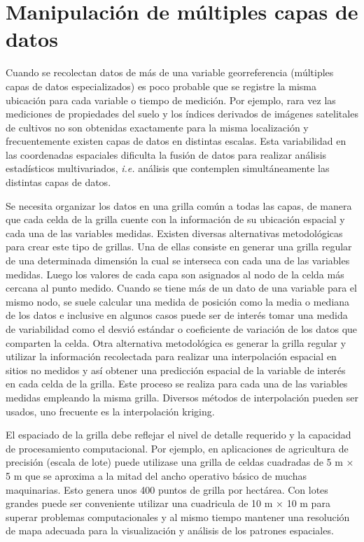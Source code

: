 \documentclass[11pt,b5paper,]{krantz}
\begin{document}
\hypertarget{manipulaciuxf3n-de-muxfaltiples-capas-de-datos}{%
\section{Manipulación de múltiples capas de datos}\label{manipulaciuxf3n-de-muxfaltiples-capas-de-datos}}

Cuando se recolectan datos de más de una variable georreferencia (múltiples capas de datos especializados) es poco probable que se registre la misma ubicación para cada variable o tiempo de medición. Por ejemplo, rara vez las mediciones de propiedades del suelo y los índices derivados de imágenes satelitales de cultivos no son obtenidas exactamente para la misma localización y frecuentemente existen capas de datos en distintas escalas. Esta variabilidad en las coordenadas espaciales dificulta la fusión de datos para realizar análisis estadísticos multivariados, \emph{i.e.} análisis que contemplen simultáneamente las distintas capas de datos.

Se necesita organizar los datos en una grilla común a todas las capas, de manera que cada celda de la grilla cuente con la información de su ubicación espacial y cada una de las variables medidas. Existen diversas alternativas metodológicas para crear este tipo de grillas. Una de ellas consiste en generar una grilla regular de una determinada dimensión la cual se interseca con cada una de las variables medidas. Luego los valores de cada capa son asignados al nodo de la celda más cercana al punto medido. Cuando se tiene más de un dato de una variable para el mismo nodo, se suele calcular una medida de posición como la media o mediana de los datos e inclusive en algunos casos puede ser de interés tomar una medida de variabilidad como el desvió estándar o coeficiente de variación de los datos que comparten la celda. Otra alternativa metodológica es generar la grilla regular y utilizar la información recolectada para realizar una interpolación espacial en sitios no medidos y así obtener una predicción espacial de la variable de interés en cada celda de la grilla. Este proceso se realiza para cada una de las variables medidas empleando la misma grilla. Diversos métodos de interpolación pueden ser usados, uno frecuente es la interpolación kriging.

El espaciado de la grilla debe reflejar el nivel de detalle requerido y la capacidad de procesamiento computacional. Por ejemplo, en aplicaciones de agricultura de precisión (escala de lote) puede utilizase una grilla de celdas cuadradas de 5 m × 5 m que se aproxima a la mitad del ancho operativo básico de muchas maquinarias. Esto genera unos 400 puntos de grilla por hectárea. Con lotes grandes puede ser conveniente utilizar una cuadricula de 10 m × 10 m para superar problemas computacionales y al mismo tiempo mantener una resolución de mapa adecuada para la visualización y análisis de los patrones espaciales.
\end{document}

